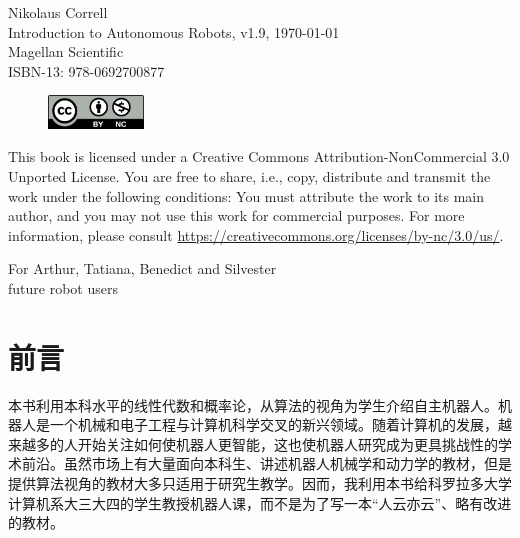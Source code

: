 \documentclass[paper=6.14in:9.21in,pagesize=pdftex,11pt,twoside,openright]{scrbook}
\begin{document}

\thispagestyle{empty}
\begin{flushleft}
Nikolaus Correll\\
Introduction to Autonomous Robots, v1.9, \today\\
Magellan Scientific\\
ISBN-13: 978-0692700877
\end{flushleft}

\vfill
 
\begin{figure}[!h]
\includegraphics[width=1in]{figs/by-nc}
\end{figure}

This book is licensed under a Creative Commons Attribution-NonCommercial 3.0 Unported License. You are free to share, i.e., copy, distribute and transmit the work under the following conditions: You must attribute the work to its main author, and you may not use this work for commercial purposes. For more information, please consult \url{https://creativecommons.org/licenses/by-nc/3.0/us/}.


\cleardoublepage
\thispagestyle{empty}
\vspace*{\fill}
\begin{center}
For Arthur, Tatiana, Benedict and Silvester\\
future robot users
\end{center}
\vspace*{\fill}

\tableofcontents

\chapter*{前言}
本书利用本科水平的线性代数和概率论，从算法的视角为学生介绍自主机器人。机器人是一个机械和电子工程与计算机科学交叉的新兴领域。随着计算机的发展，越来越多的人开始关注如何使机器人更智能，这也使机器人研究成为更具挑战性的学术前沿。虽然市场上有大量面向本科生、讲述机器人机械学和动力学的教材，但是提供算法视角的教材大多只适用于研究生教学。因而，我利用本书给科罗拉多大学计算机系大三大四的学生教授机器人课，而不是为了写一本“人云亦云”、略有改进的教材。
\end{document}
